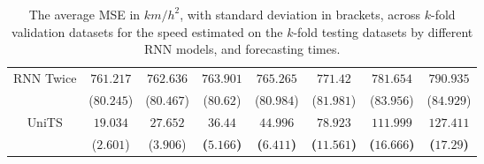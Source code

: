 \begin{table}[!ht]
{\begin{tabular}{|c|c|c|c|c|c|c|c|}
			\multirow{2}{*}{RNN Twice} & $761.217$ & $762.636$ & $763.901$ & $765.265$ & $771.42$ & $781.654$ & $790.935$ \\
			 & ($80.245$) & ($80.467$) & ($80.62$) & ($80.984$) & ($81.981$) & ($83.956$) & ($84.929$) \\ \hline
			\multirow{2}{*}{UniTS} & $19.034$ & $27.652$ & $\mathbf{36.44}$ & $\mathbf{44.996}$ & $\mathbf{78.923}$ & $\mathbf{111.999}$ & $\mathbf{127.411}$ \\
			 & ($2.601$) & ($3.906$) & \textbf{(}$\mathbf{5.166}$\textbf{)} & \textbf{(}$\mathbf{6.411}$\textbf{)} & \textbf{(}$\mathbf{11.561}$\textbf{)} & \textbf{(}$\mathbf{16.666}$\textbf{)} & \textbf{(}$\mathbf{17.29}$\textbf{)} \\ \hline
		\end{tabular}
	}
	\caption{The average MSE in ${km/h}^{2}$, with standard deviation in brackets, across $k$-fold validation datasets for the speed estimated on the $k$-fold testing datasets by different RNN models, and forecasting times.}
	\label{tab:all_speed_MSE}
\end{table}

